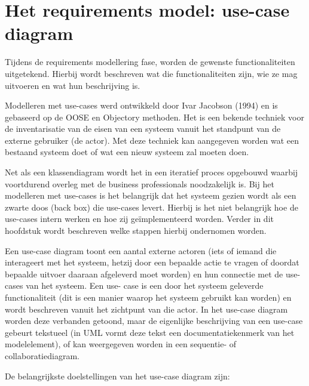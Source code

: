 \section{Het requirements model: use-case diagram}

Tijdens de requirements modellering fase, worden de gewenste functionaliteiten uitgetekend. Hierbij wordt beschreven wat die functionaliteiten zijn, wie ze mag uitvoeren en wat hun beschrijving is.

Modelleren met use-cases werd ontwikkeld door Ivar Jacobson (1994) en is gebaseerd op de OOSE en Objectory methoden. Het is een bekende techniek voor de inventarisatie van de eisen van een systeem vanuit het standpunt van de externe gebruiker (de actor). Met deze techniek kan aangegeven worden wat een bestaand systeem doet of wat een nieuw systeem zal moeten doen.

Net als een klassendiagram wordt het in een iteratief proces opgebouwd waarbij voortdurend overleg met de business professionals noodzakelijk is. Bij het modelleren met use-cases is het belangrijk dat het systeem gezien wordt als een zwarte doos (back box) die use-cases levert. Hierbij is het niet belangrijk hoe de use-cases intern werken en hoe zij geïmplementeerd worden. Verder in dit hoofdstuk wordt beschreven welke stappen hierbij ondernomen worden.

Een use-case diagram toont een aantal externe actoren (iets of iemand die interageert met het systeem, hetzij door een bepaalde actie te vragen of doordat bepaalde uitvoer daaraan afgeleverd moet worden) en hun connectie met de use-cases van het systeem. Een use- case is een door het systeem geleverde functionaliteit (dit is een manier waarop het systeem gebruikt kan worden) en wordt beschreven vanuit het zichtpunt van die actor. In het use-case diagram worden deze verbanden getoond, maar de eigenlijke beschrijving van een use-case gebeurt tekstueel (in UML vormt deze tekst een documentatiekenmerk van het modelelement), of kan weergegeven worden in een sequentie- of collaboratiediagram.

De belangrijkste doelstellingen van het use-case diagram zijn:

